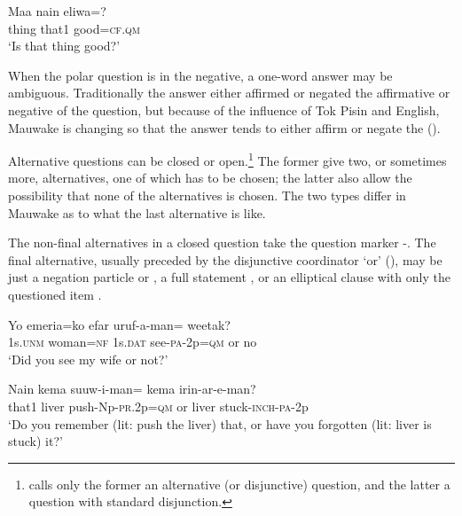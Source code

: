 \ea%
\label{ex:7:x1181}
\gll Maa  nain  eliwa=? \\
thing  that1  good=\textsc{cf}.\textsc{qm}      \\
\glt `Is that thing good?'
\z





When the polar question is in the negative, a one-word answer may be ambiguous. Traditionally the answer either affirmed or negated the affirmative or negative  of the question, but because of the influence of Tok Pisin and English, Mauwake is changing so that the answer tends to either affirm or negate the  ().

Alternative questions can be closed or open.\footnote{\citet{Haspelmath2007} calls only the former an alternative (or disjunctive) question, and the latter a question with standard disjunction.} The former give two, or sometimes more, alternatives, one of which has to be chosen; the latter also allow the possibility that none of the alternatives is chosen. The two types differ in Mauwake as to what the last alternative is like.

The non-final alternatives in a closed question take the question marker -. The final alternative, usually preceded by the disjunctive coordinator  `or' (), may be just a negation particle  or  , a full statement , or an elliptical clause with only the questioned item .

\ea%
\label{ex:7:x1182}
\gll Yo  emeria=ko  efar  uruf-a-man=    weetak? \\
1s.\textsc{unm}  woman=\textsc{nf}  1s.\textsc{dat}  see-\textsc{pa}-2p=\textsc{qm}  or  no      \\
\glt `Did you see my wife or not?'
\z





\ea%
\label{ex:7:x1183}
\gll Nain  kema  suuw-i-man=    kema  irin-ar-e-man? \\
that1  liver  push-Np-\textsc{pr}.2p=\textsc{qm}  or  liver  stuck-\textsc{inch}-\textsc{pa}-2p      \\
\glt `Do you remember (lit: push the liver) that, or have you forgotten (lit: liver is stuck) it?'
\z




